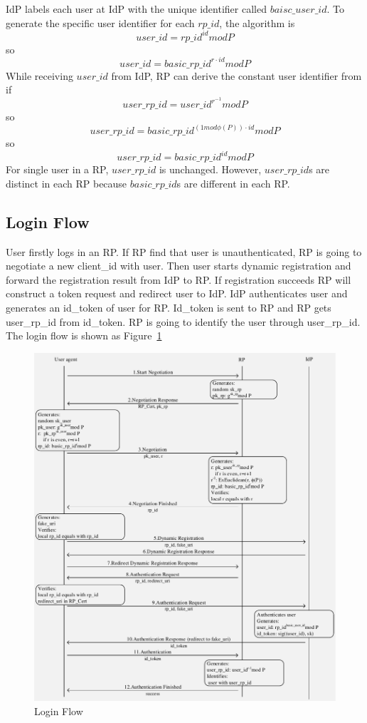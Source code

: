 IdP labels each user at IdP with the unique identifier called $baisc\_user\_id$. To generate the specific user identifier for each $rp\_id$, the algorithm is 
$$user\_id=rp\_id^{id} mod P$$
so
$$user\_id=basic\_rp\_id^{r\cdot id}modP$$
While receiving $user\_id$ from IdP, RP can derive the constant user identifier from if
$$user\_rp\_id=user\_id^{r^{-1}} mod P$$
so
$$user\_rp\_id=basic\_rp\_id^{(1 mod \phi(P))\cdot id} mod P$$
so
$$user\_rp\_id=basic\_rp\_id^{id} mod P$$
For single user in a RP, $user\_rp\_id$ is unchanged. However, $user\_rp\_id$s are distinct in each RP because $basic\_rp\_id$s are different in each RP.



\subsection{Login Flow}
User firstly logs in an RP. If RP find that user is unauthenticated, RP is going to negotiate a new client\_id with user. Then user starts dynamic registration and forward the registration result from IdP to RP. If registration succeeds RP will construct a token request and redirect user to IdP. IdP authenticates user and generates an id\_token of user for RP. Id\_token is sent to RP and RP gets user\_rp\_id from id\_token. RP is going to identify the user through user\_rp\_id. The login flow is shown as Figure~\ref{fig:process}
\begin{figure}
  \centering
  \includegraphics[width=\linewidth]{fig/process.pdf}
  \caption{Login Flow}
  \label{fig:process}
\end{figure}


